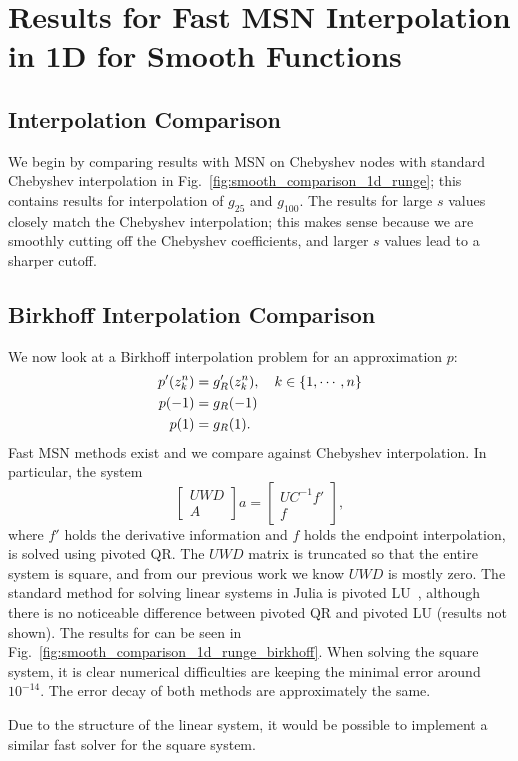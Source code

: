 \section{Results for Fast MSN Interpolation in 1D for Smooth Functions}
\label{sec:vs_I_1d}

\subsection{Interpolation Comparison}

We begin by comparing results with MSN on Chebyshev nodes
with standard Chebyshev interpolation
in Fig.~\ref{fig:smooth_comparison_1d_runge};
this contains results for interpolation of $g_{25}$ and $g_{100}$.
The results for large $s$ values closely match the Chebyshev
interpolation; this makes sense because we are smoothly cutting off
the Chebyshev coefficients, and larger $s$ values lead to a sharper
cutoff.



\subsection{Birkhoff Interpolation Comparison}

We now look at a Birkhoff interpolation problem for an approximation $p$:
%
\begin{align}
    p'(z_{k}^{n}) &= g_{R}'(z_{k}^{n}), \quad k\in\left\{ 1,\cdots,n \right\}
        \nonumber\\
    p(-1) &= g_{R}(-1) \nonumber\\
    p(1) &= g_{R}(1).
\end{align}
%
Fast MSN methods exist and we compare against Chebyshev interpolation.
In particular, the system
%
\begin{equation}
    \begin{bmatrix} UWD \\ A \end{bmatrix} a
        = \begin{bmatrix} UC^{-1}f' \\ f \end{bmatrix},
    \label{eq:smooth_birkhoff_system}
\end{equation}
%
where $f'$ holds the derivative information and $f$ holds the
endpoint interpolation, is solved using pivoted QR.
The $UWD$ matrix is truncated so that the entire system is square,
and from our previous work we know $UWD$ is mostly zero.
The standard method for solving linear systems in Julia
is pivoted LU~\cite{julialang}, although there is no noticeable difference
between pivoted QR and pivoted LU (results not shown).
The results for can be seen in
Fig.~\ref{fig:smooth_comparison_1d_runge_birkhoff}.
When solving the square system, it is clear numerical
difficulties are keeping the minimal error around $10^{-14}$.
The error decay of both methods are approximately the same.

Due to the structure of the linear system, it would be possible
to implement a similar fast solver for the square system.



